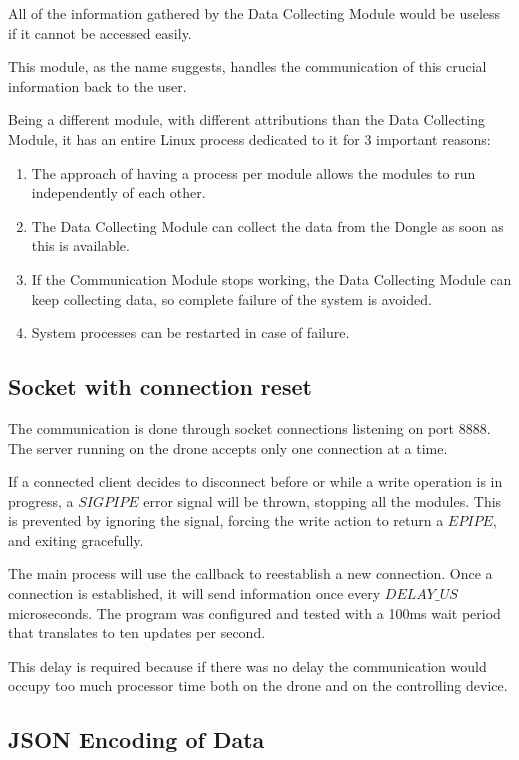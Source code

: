 All of the information gathered by the Data Collecting Module would be useless if it cannot be accessed easily.

This module, as the name suggests, handles the communication of this crucial information back to the user.

Being a different module, with different attributions than the Data Collecting Module, it has an entire Linux process dedicated to it for 3 important reasons:
\begin{enumerate}

\item The approach of having a process per module allows the modules to run independently of each other.
\item The Data Collecting Module can collect the data from the Dongle as soon as this is available.
\item If the Communication Module stops working, the Data Collecting Module can keep collecting data, so complete failure of the system is avoided.
\item System processes can be restarted in case of failure.

\end{enumerate}

\subsection{Socket with connection reset}

The communication is done through socket connections listening on port 8888. The server running on the drone accepts only one connection at a time.

If a connected client decides to disconnect before or while a write operation is in progress, a $SIGPIPE$ error signal will be thrown, stopping all the modules. This is prevented by ignoring the signal, forcing the write action to return a $EPIPE$, and exiting gracefully.

The main process will use the callback  to reestablish a new connection. Once a connection is established, it will send information once every $DELAY\_US$ microseconds. The program was configured and tested with a 100ms wait period that translates to ten updates per second.

This delay is required because if there was no delay the communication would occupy too much processor time both on the drone and on the controlling device.

\subsection{JSON Encoding of Data}

